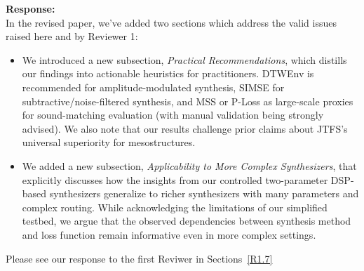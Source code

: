 \documentclass[11pt]{article}
\begin{document}
\noindent\textbf{Response:} \\
In the revised paper, we've added two sections which address the valid issues raised here and by Reviewer 1:
\begin{itemize}
  \item We introduced a new subsection, \emph{Practical Recommendations}, which distills our findings into actionable heuristics for practitioners. DTWEnv is recommended for amplitude-modulated synthesis, SIMSE for subtractive/noise-filtered synthesis, and MSS or P-Loss as large-scale proxies for sound-matching evaluation (with manual validation being strongly advised). We also note that our results challenge prior claims about JTFS’s universal superiority for mesostructures.
  \item We added a new subsection, \emph{Applicability to More Complex Synthesizers}, that explicitly discusses how the insights from our controlled two-parameter DSP-based synthesizers generalize to richer synthesizers with many parameters and complex routing. While acknowledging the limitations of our simplified testbed, we argue that the observed dependencies between synthesis method and loss function remain informative even in more complex settings.
\end{itemize}
Please see our response to the first Reviwer in Sections~\ref{R1.7}


\end{document}
